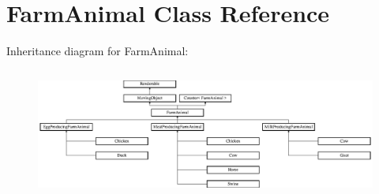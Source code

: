 \hypertarget{class_farm_animal}{}\section{Farm\+Animal Class Reference}
\label{class_farm_animal}
Inheritance diagram for Farm\+Animal\+:\begin{figure}[H]
\begin{center}
\leavevmode
\includegraphics[height=4.315992cm]{class_farm_animal}
\end{center}
\end{figure}
